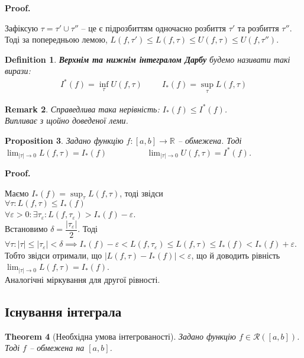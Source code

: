 \documentclass[a4paper, 10pt]{article}
\makeatletter
\def\huge{\displaystyle}
\def\qed{$\blacksquare$}
\theoremstyle{theoremdd}
\newtheorem{theorem}{Theorem}[subsection]
\theoremstyle{theoremdd}
\theoremstyle{theoremdd}
\newtheorem{definition}[theorem]{Definition}
\theoremstyle{theoremdd}
\theoremstyle{theoremdd}
\theoremstyle{theoremdd}
\newtheorem{proposition}[theorem]{Proposition}
\theoremstyle{theoremdd}
\newtheorem{remark}[theorem]{Remark}
\theoremstyle{theoremdd}
\theoremstyle{theoremdd}
\renewenvironment{proof}[1][Proof.\\]{\par
\pushQED{\hfill \qed}%
\normalfont \topsep6\p@\@plus6\p@\relax
\trivlist
\item\relax
{\bfseries
#1\@addpunct{.}}\hspace\labelsep\ignorespaces
}{%
\popQED\endtrivlist\@endpefalse
}
\makeatother
\begin{document}
\begin{proof}
Зафіксую $\tau = \tau' \cup \tau''$ -- це є підрозбиттям одночасно розбиття $\tau'$ та розбиття $\tau''$. Тоді за попередньою лемою, $L(f,\tau') \leq L(f,\tau) \leq U(f,\tau) \leq U(f,\tau'')$.
\end{proof}

\begin{definition}
\textbf{Верхнім та нижнім інтегралом Дарбу} будемо називати такі вирази:
\begin{align*}
I^*(f) = \inf_\tau U(f, \tau) \hspace{1cm} I_*(f) = \sup_\tau L(f,\tau)
\end{align*}
\end{definition}

\begin{remark}
Справедлива така нерівність: $I_*(f) \leq I^*(f)$.\\
\textit{Випливає з щойно доведеної леми.}
\end{remark}

\begin{proposition}
Задано функцію $f \colon [a,b] \to \mathbb{R}$ -- обмежена. Тоді\\
$\huge\lim_{|\tau| \to 0} L(f,\tau) = I_*(f) \hspace{2cm} \lim_{|\tau| \to 0} U(f,\tau) = I^*(f)$.
\end{proposition}

\begin{proof}
Маємо $I_*(f) = \huge\sup_\tau L(f,\tau)$, тоді звідси\\
$\forall \tau: L(f,\tau) \leq I_*(f)$\\
$\forall \varepsilon > 0: \exists \tau_\varepsilon: L(f,\tau_\varepsilon) > I_*(f) - \varepsilon$.\\
Встановимо $\delta = \dfrac{|\tau_\varepsilon|}{2}$. Тоді $\forall \tau: |\tau| \leq |\tau_\varepsilon| < \delta \implies I_*(f) - \varepsilon < L(f,\tau_\varepsilon) \leq L(f,\tau) \leq I_*(f) < I_*(f) + \varepsilon$.\\
Тобто звідси отримали, що $|L(f,\tau) - I_*(f)| < \varepsilon$, що й доводить рівність $\huge\lim_{|\tau| \to 0} L(f,\tau) = I_*(f)$.\\
Аналогічні міркування для другої рівності.
\end{proof}

\subsection{Існування інтеграла}
\begin{theorem}[Необхідна умова інтегрованості]
Задано функцію $f \in \mathcal{R}([a,b])$. Тоді $f$ -- обмежена на $[a,b]$.
\end{theorem}
\end{document}
